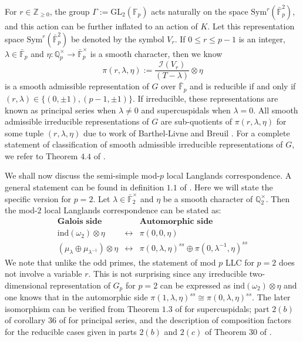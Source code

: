 \documentclass[11pt, reqno]{amsart}
\numberwithin{equation}{section}
\newcommand\Q{\mathbb{Q}}
\newcommand\ind{\mathrm{ind}}
\newcommand\GL{{\mathrm{GL}}}
\newcommand{\Z}{\mathbb{Z}}
\newcommand{\F}{\mathbb{F}}
\newcommand\Sym{{\mathrm {Sym}}}
\theoremstyle{definition}
\theoremstyle{remark}
\theoremstyle{definition}
\theoremstyle{remark}
\theoremstyle{remark}
\begin{document}
For $r \in \Z_{\geq 0}$, the group $\Gamma:=\GL_2(\F_p)$ acts naturally on the space $\Sym^{r}(\bar{\F}_{p}^2)$, and this action can be further inflated to an action of $K$. Let this representation space  $\Sym^{r}(\bar{\F}_{p}^2)$  be denoted by the symbol $V_{r}$. If $0\leq r\leq p-1$ is an integer, $\lambda \in \bar{\F}_{p}$ and $\eta:\Q_{p}^{\times} \rightarrow\bar{\F}_{p}^{\times}$ is a smooth character,  then we  know
$$\pi(r,\lambda,\eta) := \frac{\mathcal{I}(V_{r})}{(T-\lambda)} \otimes \eta$$ 
is a smooth admissible representation of $G$ over $\bar{\F}_{p}$ and is reducible if and only if $(r,\lambda) \in \{(0,\pm1),(p-1,\pm1)\}$. If irreducible, these representations are known as principal series when $\lambda \neq 0$ and supercuspidals when $\lambda=0$. All smooth admissible irreducible representations of $G$ are  sub-quotients of $\pi(r,\lambda, \eta)$ for some tuple $(r,\lambda,\eta)$ due to work of Barthel-Livne \cite{Barthel-Livne94} and Breuil \cite{Breuil1}. For a complete statement of classification of smooth admissible irreducible representations of $G$, we refer to Theorem $4.4$ of \cite{Breuil07}.


We shall now discuss the semi-simple mod-$p$ local Langlands correspondence. A general statement can be found in definition $1.1$ of \cite{[Br03]}. Here we will state the specific version for $p=2$. Let $\lambda \in \bar{\F}_{2}^\times$ and $\eta$ be a smooth character of $\Q_{2}^{\times}$. Then the mod-$2$ local Langlands correspondence can be stated as:
	\begin{eqnarray*}
		\textbf{Galois side} & & \textbf{Automorphic side}\\
			\ind(\omega_{2}) \otimes \eta &\leftrightarrow& \pi(0,0,\eta)\\
			(\mu_{\lambda} \oplus \mu_{\lambda^{-1}})\otimes \eta 	&\leftrightarrow & \pi(0,\lambda,\eta)^{ss} \oplus \pi(0,\lambda^{-1}, \eta)^{ss}
		\end{eqnarray*}
We note that unlike the odd primes, the statement of mod $p$ LLC for $p=2$ does not involve a variable $r$. %
This is not surprising since any irreducible two-dimensional representation of $G_{p}$ for $p=2$ can be expressed as $\ind(\omega_{2})\otimes \eta$ and one knows that in the automorphic side $\pi(1,\lambda, \eta)^{ss} \cong \pi(0, \lambda, \eta)^{ss}$. The later isomorphism can be verified from Theorem $1.3$ of \cite{Breuil1} for supercuspidals; part $2(b)$ of corollary $36$ of \cite{Barthel-Livne94} for principal series, and the description of composition factors for the reducible cases given in parts $2(b)$ and $2(c)$ of Theorem $30$ of \cite{Barthel-Livne94}.
        
\end{document}
